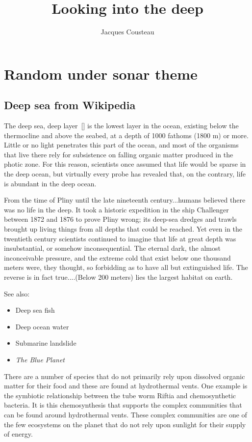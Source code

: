 \documentclass[twocolumn]{article}
\title{Looking into the deep}
\author{Jacques Cousteau}
\begin{document}
\section{Random under sonar theme}

\subsection{Deep sea from Wikipedia}
The deep sea, deep layer~[\cite{gortney2010department}] is the lowest layer in the ocean, existing below the thermocline and above the seabed, at a depth of 1000 fathoms (1800 m) or more. Little or no light penetrates this part of the ocean, and most of the organisms that live there rely for subsistence on falling organic matter produced in the photic zone. For this reason, scientists once assumed that life would be sparse in the deep ocean, but virtually every probe has revealed that, on the contrary, life is abundant in the deep ocean.

    From the time of Pliny until the late nineteenth century...humans believed there was no life in the deep. It took a historic expedition in the ship Challenger between 1872 and 1876 to prove Pliny wrong; its deep-sea dredges and trawls brought up living things from all depths that could be reached. Yet even in the twentieth century scientists continued to imagine that life at great depth was insubstantial, or somehow inconsequential. The eternal dark, the almost inconceivable pressure, and the extreme cold that exist below one thousand meters were, they thought, so forbidding as to have all but extinguished life. The reverse is in fact true....(Below 200 meters) lies the largest habitat on earth.

 See also:
\begin{itemize}
\item Deep sea fish
\item Deep ocean water
\item Submarine landslide
\item \emph{The Blue Planet}
\end{itemize}

There are a number of species that do not primarily rely upon dissolved organic matter for their food and these are found at hydrothermal vents. One example is the symbiotic relationship between the tube worm Riftia and chemosynthetic bacteria. It is this chemosynthesis that supports the complex communities that can be found around hydrothermal vents. These complex communities are one of the few ecosystems on the planet that do not rely upon sunlight for their supply of energy.
\end{document}
